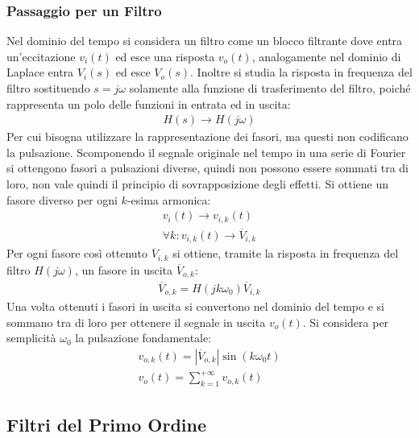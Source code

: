 \documentclass{article}
\numberwithin{equation}{subsection}
\begin{document}
\subsubsection{Passaggio per un Filtro}
Nel dominio del tempo si considera un filtro come un blocco filtrante dove entra un'eccitazione $v_i(t)$ ed esce una risposta $v_o(t)$, analogamente nel dominio di 
Laplace entra $V_i(s)$ ed esce $V_o(s)$. Inoltre si studia la risposta in frequenza del filtro sostituendo $s=j\omega$ solamente alla funzione di trasferimento del filtro, 
poiché rappresenta un polo delle funzioni in entrata ed in uscita:
\begin{gather*}
    H(s)\to H(j\omega)
\end{gather*}
Per cui bisogna utilizzare la rappresentazione dei fasori, ma questi non codificano la pulsazione. Scomponendo il segnale originale nel tempo in una serie di Fourier si 
ottengono fasori a pulsazioni diverse, quindi non possono essere sommati tra di loro, non vale quindi il principio di sovrapposizione degli effetti. Si ottiene 
un fasore diverso per ogni $k$-esima armonica:
\begin{gather*}
    v_i(t)\to v_{i,k}(t)\\
    \forall k:v_{i,k}(t)\to \overline{V}_{i,k}
\end{gather*}
Per ogni fasore così ottenuto $\overline{V}_{i,k}$ si ottiene, tramite la risposta in frequenza del filtro $H(j\omega)$, un fasore in uscita $\overline{V}_{o,k}$:
\begin{gather*}
    \overline{V}_{o,k}=H(jk\omega_0)\overline{V}_{i,k}
\end{gather*}
Una volta ottenuti i fasori in uscita si convertono nel dominio del tempo e si sommano tra di loro per ottenere il segnale in uscita $v_o(t)$. 
Si considera per semplicità $\omega_0$ la pulsazione fondamentale:
\begin{gather*}
    v_{o,k}(t)=|\overline{V}_{o,k}|\sin(k\omega_0 t)\\
    v_o(t)=\displaystyle\sum_{k=1}^{+\infty}v_{o,k}(t) 
\end{gather*} 

\subsection{Filtri del Primo Ordine}
\end{document}
